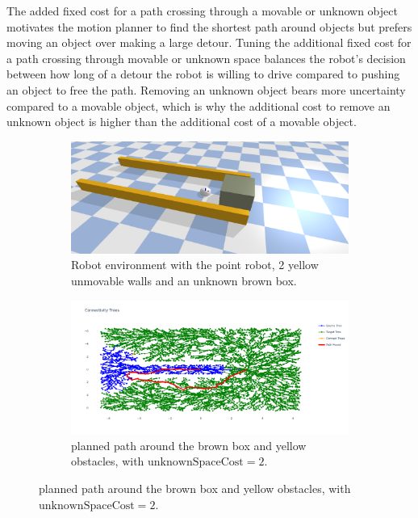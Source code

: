 The added fixed cost for a path crossing through a movable or unknown object motivates the motion planner to find the shortest path around objects but prefers moving an object over making a large detour. Tuning the additional fixed cost for a path crossing through movable or unknown space balances the robot's decision between how long of a detour the robot is willing to drive compared to pushing an object to free the path. Removing an unknown object bears more uncertainty compared to a movable object, which is why the additional cost to remove an unknown object is higher than the additional cost of a movable object. 

\begin{figure}[H]

    \centering
    \begin{subfigure}{\textwidth}
    \centering
    \includegraphics[width=\textwidth]{figures/push_or_drive}
    \caption{Robot environment with the point robot, 2 yellow unmovable walls and an unknown brown box.}
    \end{subfigure}

    \begin{subfigure}{1.11\textwidth}
    \centering
    \includegraphics[width=\textwidth]{figures/mp_high_fixed_cost}
    \caption{planned path around the brown box and yellow obstacles, with $\textrm{unknownSpaceCost} = 2$.}
    \end{subfigure}


\end{figure}
